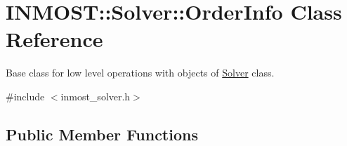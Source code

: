 \hypertarget{classINMOST_1_1Solver_1_1OrderInfo}{\section{I\-N\-M\-O\-S\-T\-:\-:Solver\-:\-:Order\-Info Class Reference}
\label{classINMOST_1_1Solver_1_1OrderInfo}
}


Base class for low level operations with objects of \hyperlink{classINMOST_1_1Solver}{Solver} class.  




{\ttfamily \#include $<$inmost\-\_\-solver.\-h$>$}

\subsection*{Public Member Functions}
